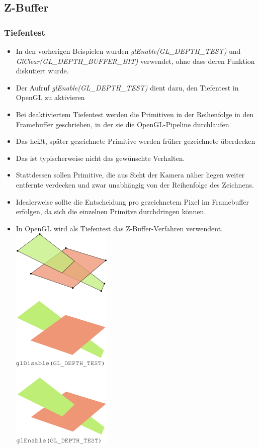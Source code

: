 \documentclass{scrartcl}
\begin{document}
\subsection{Z-Buffer}

\subsubsection{Tiefentest}

\begin{itemize}
	\item In den vorherigen Beispielen wurden \textit{glEnable(GL\_DEPTH\_TEST)} und \\
	\textit{GlClear(GL\_DEPTH\_BUFFER\_BIT)} verwendet, ohne dass deren Funktion diskutiert wurde.
	\item Der Aufruf \textit{glEnable(GL\_DEPTH\_TEST)} dient dazu, den Tiefentest in OpenGL zu aktivieren
	\item Bei deaktiviertem Tiefentest werden die Primitiven in der Reihenfolge in den Framebuffer geschrieben, in der sie die OpenGL-Pipeline durchlaufen.
	\item Das heißt, später gezeichnete Primitive werden früher gezeichnete überdecken
	\item Das ist typischerweise nicht das gewünschte Verhalten.
	\item Stattdessen sollen Primitive, die aus Sicht der Kamera näher liegen weiter entfernte verdecken und zwar unabhängig von der Reihenfolge des Zeichnens.
	\item Idealerweise sollte die Entscheidung pro gezeichnetem Pixel im Framebuffer erfolgen, da sich die einzelnen Primitve durchdringen können.
	\item In OpenGL wird als Tiefentest das Z-Buffer-Verfahren verwendent. \\
	\includegraphics[scale=1]{figures/depthtest_example.png}
\end{itemize}
\end{document}
